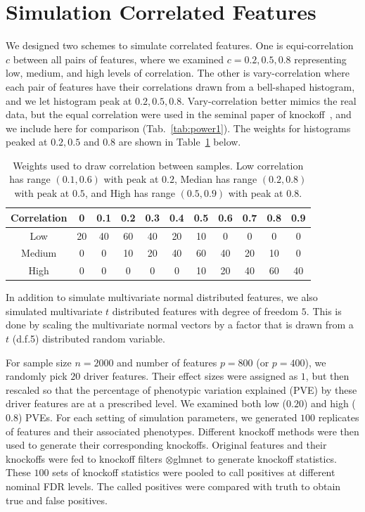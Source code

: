 \documentclass[12pt,Times]{article}
\def\cite{\citep}
\begin{document}
\newpage
\section{Simulation Correlated Features} \label{sec:sim}
We designed two schemes to simulate correlated features. One is equi-correlation $c$ between all pairs of features, where we examined $c=0.2,0.5,0.8$  representing low, medium, and high levels of correlation. The other is vary-correlation where each pair of features have their correlations drawn from a bell-shaped histogram, and we let histogram peak at $0.2, 0.5, 0.8$. Vary-correlation better mimics the real data, but the equal correlation were used in the seminal paper of knockoff~\cite{barber.candes.15}, and we  include here for comparison (Tab.~\ref{tab:power1}). The weights for histograms peaked at $0.2, 0.5$ and $0.8$ are shown in Table~\ref{weights} below.  

\begin{table}[htp]
\begin{center}
\begin{tabular}{c|cccccccccc}
Correlation &0&0.1&0.2&0.3&0.4&0.5&0.6&0.7&0.8&0.9 \\
\hline
Low &20&40&60&40&20&10&0&0&0&0\\
Medium &0&0&10&20&40&60&40&20&10&0\\
High &0&0&0&0&0&10&20&40&60&40 \\
\end{tabular}
\end{center}
\vspace{-0.2in}
\caption{Weights used to draw correlation between samples. Low correlation has range $(0.1, 0.6)$ with peak at $0.2$, Median has range $(0.2,0.8)$ with peak at $0.5$, and High has range $(0.5,0.9)$ with peak at $0.8$.}
\label{weights}
\end{table}%

In addition to simulate multivariate normal distributed features, we also simulated multivariate $t$ distributed features with degree of freedom $5$. This is done by scaling the multivariate normal vectors by a factor that is drawn from a $t$ (d.f.5) distributed random variable.  

For sample size $n=2000$ and number of features $p=800$ (or $p=400$),  we randomly pick $20$ driver features.  Their effect sizes were assigned as $1$, but then rescaled so that the percentage of phenotypic variation explained (PVE) by these driver features are at a prescribed level. 
We examined both low ($0.20$) and high ($0.8$) PVEs.  
%
For each setting of simulation parameters, we generated $100$ replicates of features and their associated phenotypes. Different knockoff methods were then used to generate their corresponding knockoffs. Original features and their knockoffs were fed to knockoff filters \allowbreak$\otimes$glmnet to generate knockoff statistics. These  $100$ sets of knockoff statistics  were pooled to call positives at different nominal FDR levels.  The called positives were compared with truth to obtain true and false positives.  
\end{document}
